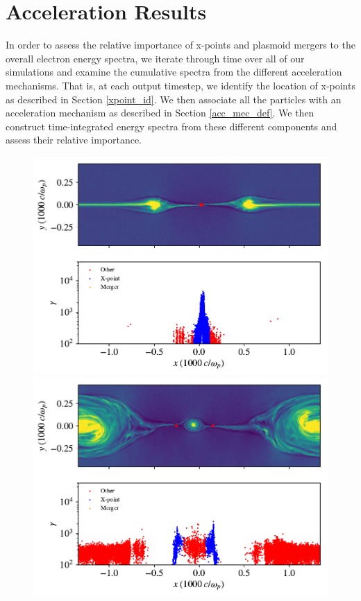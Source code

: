 \documentclass[iop,twocolappendix]{emulateapj}
\begin{document}
\section{Acceleration Results}
In order to assess the relative importance of x-points and plasmoid mergers to the overall electron energy spectra, we iterate through time over all of our simulations and examine the cumulative spectra from the different acceleration mechanisms.  That is, at each output timestep, we identify the location of x-points as described in Section \ref{xpoint_id}.  We then associate all the particles with an acceleration mechanism as described in Section \ref{acc_mec_def}.  We then construct time-integrated energy spectra from these different components and assess their relative importance.
\begin{figure}[htp]
	{
		\includegraphics[width=\linewidth]{bguide3_triggered_snap9.pdf}
	}
	\newline
	{
		\includegraphics[width=\linewidth]{bguide3_triggered_snap33.pdf}
}
\end{figure}
\end{document}
